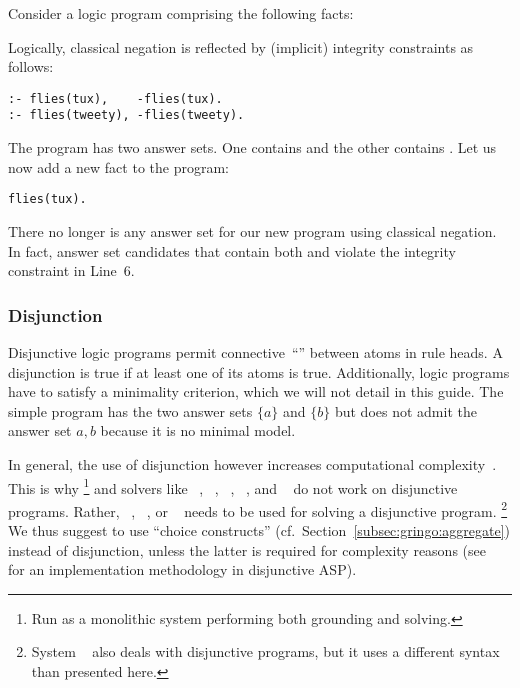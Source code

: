 \begin{example}\label{ex:flies:neg}
Consider a logic program comprising the following facts:
%


%
Logically, classical negation is reflected by
(implicit) integrity constraints as follows:%
%
\begin{lstlisting}[firstnumber=6]
:- flies(tux),    -flies(tux).
:- flies(tweety), -flies(tweety).
\end{lstlisting}
The program has two answer sets.
One contains  and the other contains .
Let us now add a new fact to the program:
\begin{lstlisting}[firstnumber=8]
flies(tux).
\end{lstlisting}
There no longer is any answer set for our new program using classical negation.
In fact, answer set candidates that contain both
 and
 violate the integrity constraint in Line~6.
\eexample
\end{example}


\subsubsection{Disjunction}\label{subsec:gringo:disjunction}

Disjunctive logic programs permit connective~``\code{|}'' between atoms in rule heads.
A disjunction is true if at least one of its atoms is true.
Additionally, logic programs have to satisfy a minimality criterion, 
which we will not detail in this guide.
The simple program  has the two answer sets $\{a\}$ and $\{b\}$ but
does not admit the answer set ${a,b}$ because it is no minimal model.

In general, the use of disjunction however increases
computational complexity~\cite{eitgot95a}.
This is why \clingo%
\footnote{Run as a monolithic system performing both grounding and solving.}
and solvers like 
\assat~\cite{linzha04a},
\clasp~\cite{gekanesc07b},
\nomorepp~\cite{angelinesc05c},
\smodels~\cite{siniso02a}, and
\smodelscc~\cite{warsch04a}
do not work on disjunctive programs.
Rather,
\claspD~\cite{drgegrkakoossc08a},
\cmodels~\cite{gilima06a,lierler05a}, or
\gnt~\cite{janisesiyo06a}
needs to be used for solving a disjunctive program.%
\footnote{System \dlv~\cite{dlv03a} also deals with disjunctive programs,
  but it uses a different syntax than presented here.}
We thus suggest to use ``choice constructs'' (cf.\ Section~\ref{subsec:gringo:aggregate})
instead of disjunction, unless the latter is required for complexity reasons
(see~\cite{eitpol06a} for an implementation methodology in disjunctive ASP).


